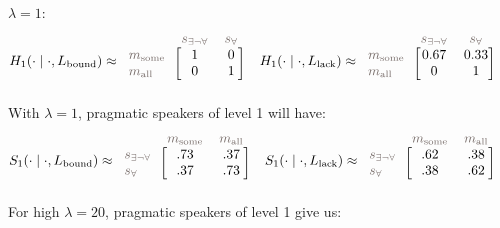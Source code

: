 \documentclass[a4paper, 11pt]{article}
\theoremstyle{Satz}
\newcommand{\state}{\ensuremath{s}\xspace}		%
\newcommand{\mystate}[1]{\ensuremath{\state_{\text{#1}}}\xspace} %
\newcommand{\mylang}[1]{\ensuremath{L_{\text{#1}}}\xspace} %
\newcommand{\messg}{\ensuremath{m}\xspace}		%
\newcommand{\mymessg}[1]{\ensuremath{\messg_{\text{#1}}}\xspace} %
\newcommand{\ssome}{\mystate{\ensuremath{\exists\neg\forall}}}
\newcommand{\sall}{\mystate{\ensuremath{\forall}}}
\newcommand{\msome}{\mymessg{some}}
\newcommand{\mall}{\mymessg{all}}
\newcommand{\Lbound}{\mylang{bound}}
\newcommand{\Llack}{\mylang{lack}}
\newcommand{\mygray}[1]{{\textcolor{mygray}{#1}}}
\begin{document}
$\lambda = 1$:
\begin{align*}
  H_1(\cdot \mid \cdot, \Lbound) & \approx \begin{blockarray}{lcc}
    & \mygray{\ssome} & \mygray{\sall} \\
    \begin{block}{l[cc]}
      \mygray{\msome} & 1 & 0 \\
      \mygray{\mall}  & 0 & 1 \\
    \end{block}
  \end{blockarray} &
  H_1(\cdot \mid \cdot, \Llack) & \approx \begin{blockarray}{lcc}
    & \mygray{\ssome} & \mygray{\sall} \\
    \begin{block}{l[cc]}
      \mygray{\msome} & 0.67 & 0.33 \\
      \mygray{\mall}  & 0 & 1 \\
    \end{block}
  \end{blockarray} 
\end{align*}
With $\lambda = 1$, pragmatic speakers of level 1 will have:
\begin{align*}
  S_1(\cdot \mid \cdot, \Lbound) & \approx \begin{blockarray}{lcc}
    & \mygray{\msome} & \mygray{\mall} \\
    \begin{block}{l[cc]}
      \mygray{\ssome} & .73 & .37 \\
      \mygray{\sall}  & .37 & .73 \\
    \end{block}
  \end{blockarray} &
  S_1(\cdot \mid \cdot, \Llack) & \approx \begin{blockarray}{lcc}
    & \mygray{\msome} & \mygray{\mall} \\
    \begin{block}{l[cc]}
      \mygray{\ssome} & .62 & .38 \\
      \mygray{\sall}  & .38 & .62 \\
    \end{block}
  \end{blockarray} 
\end{align*}
For high $\lambda = 20$, pragmatic speakers of level 1 give us:
\end{document}
